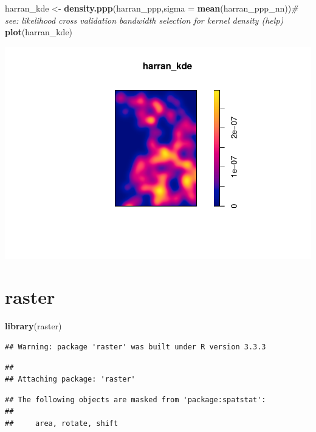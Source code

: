 \documentclass[]{article}
\newenvironment{Shaded}{\begin{snugshade}}{\end{snugshade}}
\newcommand{\KeywordTok}[1]{\textcolor[rgb]{0.13,0.29,0.53}{\textbf{{#1}}}}
\newcommand{\DataTypeTok}[1]{\textcolor[rgb]{0.13,0.29,0.53}{{#1}}}
\newcommand{\StringTok}[1]{\textcolor[rgb]{0.31,0.60,0.02}{{#1}}}
\newcommand{\CommentTok}[1]{\textcolor[rgb]{0.56,0.35,0.01}{\textit{{#1}}}}
\newcommand{\NormalTok}[1]{{#1}}
\begin{document}
\begin{Shaded}
\begin{Highlighting}[]
\NormalTok{harran_kde <-}\StringTok{ }\KeywordTok{density.ppp}\NormalTok{(harran_ppp,}\DataTypeTok{sigma =} \KeywordTok{mean}\NormalTok{(harran_ppp_nn))}\CommentTok{# see: likelihood cross validation bandwidth selection for kernel density (help)}
\KeywordTok{plot}\NormalTok{(harran_kde)}
\end{Highlighting}
\end{Shaded}

\includegraphics{HarranPlain_files/figure-latex/unnamed-chunk-5-1.pdf}

\section{raster}\label{raster}

\begin{Shaded}
\begin{Highlighting}[]
\KeywordTok{library}\NormalTok{(raster)}
\end{Highlighting}
\end{Shaded}

\begin{verbatim}
## Warning: package 'raster' was built under R version 3.3.3
\end{verbatim}

\begin{verbatim}
## 
## Attaching package: 'raster'
\end{verbatim}

\begin{verbatim}
## The following objects are masked from 'package:spatstat':
## 
##     area, rotate, shift
\end{verbatim}
\end{document}
